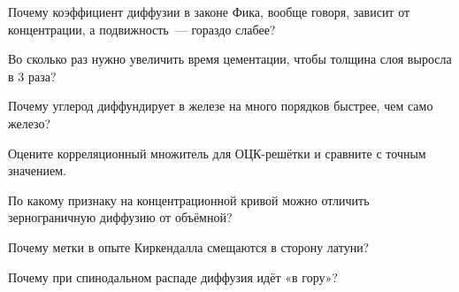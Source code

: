 \begin{proverka}
\item Почему коэффициент диффузии в законе Фика, вообще говоря, зависит
от концентрации, а подвижность~— гораздо слабее?
\item Во сколько раз нужно увеличить время цементации, чтобы толщина
слоя выросла в 3 раза?
\item Почему углерод диффундирует в железе на много порядков быстрее,
чем само железо?
\item Оцените корреляционный множитель для ОЦК-решётки и сравните с
точным значением.
\item По какому признаку на концентрационной кривой можно отличить
зернограничную диффузию от объёмной?
\item Почему метки в опыте Киркендалла смещаются в сторону латуни?
\item Почему при спинодальном распаде диффузия идёт «в гору»?
\end{proverka}
